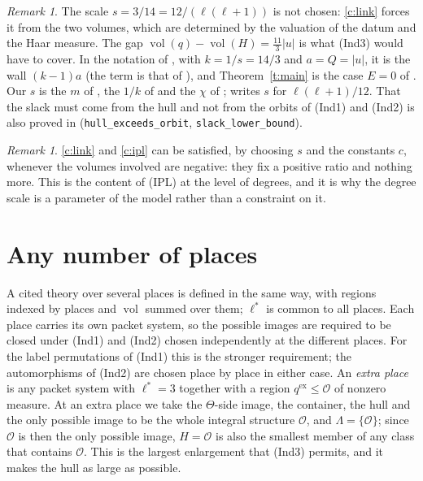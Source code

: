\documentclass[11pt]{article}
\theoremstyle{plain}
\theoremstyle{definition}
\theoremstyle{remark}
\newtheorem{remark}[theorem]{Remark}
\newcommand{\vol}{\operatorname{vol}}
\newcommand{\cO}{\mathcal O}
\begin{document}
\begin{remark}
The scale $s=3/14=12/(\ell(\ell+1))$ is not chosen: \ref{c:link} forces it from the two
volumes, which are determined by the valuation of the datum and the Haar measure. The gap
$\vol(q)-\vol(H)=\frac{11}3|u|$ is what (Ind3) would have to cover. In the notation of
\cite{RF,SL}, with $k=1/s=14/3$ and $a=Q=|u|$, it is the wall $(k-1)a$ (the term is that
of \cite{LANA}), and Theorem~\ref{t:main} is the case $E=0$ of \cite[Corollary~5.4]{SL}.
Our $s$ is the $m$ of \cite{SL}, the $1/k$ of \cite{II,RF,TC,BS} and the $\chi$ of
\cite{Fifth}; \cite{lana} writes $s$ for $\ell(\ell+1)/12$. That the slack must come from
the hull and not from the orbits of (Ind1) and (Ind2) is also proved in \cite{Takkun}
(\texttt{hull\_exceeds\_orbit}, \texttt{slack\_lower\_bound}).
\end{remark}

\begin{remark}\label{r:weakaxioms}
\ref{c:link} and \ref{c:ipl} can be satisfied, by choosing $s$ and the constants $c$,
whenever the volumes involved are negative: they fix a positive ratio and nothing more. This is the content of (IPL) at the level of degrees, and
it is why the degree scale is a parameter of the model rather than a constraint on it.
\end{remark}

\section{Any number of places}\label{s:robust}

A cited theory over several places is defined in the same way, with regions indexed by
places and $\vol$ summed over them; $\ell^*$ is common to all places. Each place carries its
own packet system, so the possible images are required to be closed under (Ind1) and (Ind2)
chosen independently at the different places. For the label permutations of (Ind1) this is
the stronger requirement; the automorphisms of (Ind2) are chosen place by place in either
case. An \emph{extra
place} is any packet system with $\ell^*=3$ together with a region $q^{\mathrm{ex}}\le\cO$
of nonzero measure. At an extra place we take the $\Theta$-side image, the container,
the hull and the only possible image to be the whole integral structure $\cO$, and
$\Lambda=\{\cO\}$; since $\cO$ is then the only possible image, $H=\cO$ is also the
smallest member of any class that contains $\cO$. This is the largest enlargement that
(Ind3) permits, and it makes the hull as large as possible.
\end{document}
